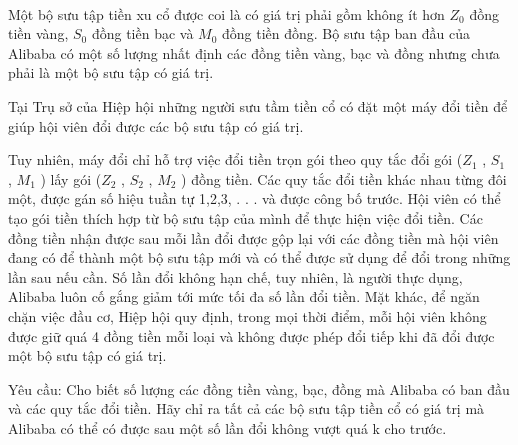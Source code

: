  

Một bộ sưu tập tiền xu cổ được coi là có giá trị phải gồm không ít hơn $Z_{0}$ đồng tiền vàng, $S_{0}$ đồng tiền bạc và $M_{0}$ đồng tiền đồng. Bộ sưu tập ban đầu của Alibaba có một số lượng nhất định các đồng tiền vàng, bạc và đồng nhưng chưa phải là một bộ sưu tập có giá trị.

Tại Trụ sở của Hiệp hội những người sưu tầm tiền cổ có đặt một máy đổi tiền để giúp hội viên đổi được các bộ sưu tập có giá trị.

Tuy nhiên, máy đổi chỉ hỗ trợ việc đổi tiền trọn gói theo quy tắc đổi gói ($Z_{1}$ , $S_{1}$ , $M_{1}$ ) lấy gói ($Z_{2}$ , $S_{2}$ , $M_{2}$ ) đồng tiền. Các quy tắc đổi tiền khác nhau từng đôi một, được gán số hiệu tuần tự 1,2,3, . . . và được công bố trước. Hội viên có thể tạo gói tiền thích hợp từ bộ sưu tập của mình để thực hiện việc đổi tiền. Các đồng tiền nhận được sau mỗi lần đổi được gộp lại với các đồng tiền mà hội viên đang có để thành một bộ sưu tập mới và có thể được sử dụng để đổi trong những lần sau nếu cần. Số lần đổi không hạn chế, tuy nhiên, là người thực dụng, Alibaba luôn cố gắng giảm tới mức tối đa số lần đổi tiền. Mặt khác, để ngăn chặn việc đầu cơ, Hiệp hội quy định, trong mọi thời điểm, mỗi hội viên không được giữ quá 4 đồng tiền mỗi loại và không được phép đổi tiếp khi đã đổi được một bộ sưu tập có giá trị.

Yêu cầu: Cho biết số lượng các đồng tiền vàng, bạc, đồng mà Alibaba có ban đầu và các quy tắc đổi tiền. Hãy chỉ ra tất cả các bộ sưu tập tiền cổ có giá trị mà Alibaba có thể có được sau một số lần đổi không vượt quá k cho trước.